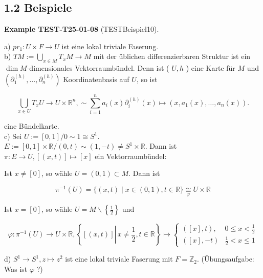 \documentclass[10pt, letterpaper]{article}
\newcommand{\CustomHeading}[3]{%
  \par\medskip\noindent%
  \textbf{#1 #2} \textnormal{(#3)}.\enskip%
}
\newenvironment{EXA}[2]{\begin{unitbox}\CustomHeading{Example}{#1}{#2}}{\end{unitbox}}
\begin{document}
\subsection*{1.2 Beispiele}
\begin{EXA}{TEST-T25-01-08}{TESTBeispiel10}
a) $p r_{1}: U \times F \rightarrow U$ ist eine lokal triviale Faserung.\\
b) $T M:=\bigcup_{x \in M} T_{x} M \rightarrow M$ mit der üblichen differenzierbaren Struktur ist ein $\operatorname{dim} M$-dimensionales Vektorraumbündel. Denn ist ( $U, h$ ) eine Karte für $M$ und $\left(\partial_{1}^{(h)}, \ldots, \partial_{n}^{(h)}\right)$ Koordinatenbasis auf $U$, so ist

$$
\bigcup_{x \in U} T_{x} U \rightarrow U \times \mathbb{R}^{n}, \sim \sum_{i=1}^{n} a_{i}(x) \partial_{i}^{(h)}(x) \mapsto\left(x, a_{1}(x), \ldots, a_{n}(x)\right) .
$$

eine Bündelkarte.\\
c) Sei $U:=[0,1] / 0 \sim 1 \cong S^{1}$.\\
$E:=[0,1] \times \mathbb{R} /(0, t) \sim(1,-t) \neq S^{1} \times \mathbb{R}$. Dann ist $\pi: E \rightarrow U,[(x, t)] \mapsto[x]$ ein Vektorraumbündel:

Ist $x \neq[0]$, so wähle $U=(0,1) \subset M$. Dann ist

$$
\pi^{-1}(U)=\{(x, t) \mid x \in(0,1), t \in \mathbb{R}\} \underset{\varphi}{\cong} U \times \mathbb{R}
$$

Ist $x=[0]$, so wähle $U=M \backslash\left\{\frac{1}{2}\right\}$ und

$$
\varphi: \pi^{-1}(U) \rightarrow U \times \mathbb{R},\left\{[(x, t)] \left\lvert\, x \neq \frac{1}{2}\right., t \in \mathbb{R}\right\} \mapsto \begin{cases}([x], t), & 0 \leq x<\frac{1}{2} \\ ([x],-t) & \frac{1}{2}<x \leq 1\end{cases}
$$

d) $S^{1} \rightarrow S^{1}, z \mapsto z^{2}$ ist eine lokal triviale Faserung mit $F=\mathbb{Z}_{2}$. (Übungsaufgabe: Was ist $\varphi$ ?)
\end{EXA}
\end{document}
